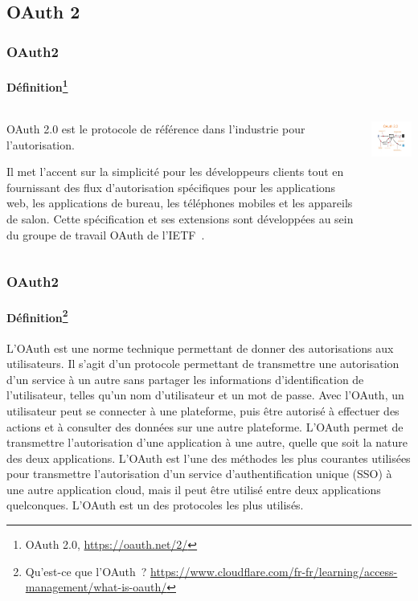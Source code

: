 \documentclass{beamer}
\begin{document}
    \subsection{OAuth 2}\label{subsec:oauth-2}
    \begin{frame}
        \frametitle{OAuth2}
        \framesubtitle{Définition\footnote{OAuth 2.0, \url{https://oauth.net/2/}}}
        \transdissolve
        \begin{columns}
            \begin{column}{0.6\textwidth}
                OAuth 2.0 est le protocole de référence dans l'industrie pour l'autorisation.

                Il met l'accent sur la simplicité pour les développeurs clients tout en fournissant des flux d'autorisation spécifiques pour les applications web, les applications de bureau, les téléphones mobiles et les appareils de salon.
                Cette spécification et ses extensions sont développées au sein du groupe de travail OAuth de l'IETF~.
            \end{column}
            \begin{column}{0.4\textwidth}
                \centering
                \includegraphics[width=6cm]{image/oauth2-flow}
            \end{column}
        \end{columns}
    \end{frame}

    \begin{frame}
        \frametitle{OAuth2}
        \framesubtitle{Définition\footnote{Qu'est-ce que l'OAuth~? \url{https://www.cloudflare.com/fr-fr/learning/access-management/what-is-oauth/}}}
        \transdissolve
        L'OAuth est une norme technique permettant de donner des autorisations aux utilisateurs.
        Il s'agit d'un protocole permettant de transmettre une autorisation d'un service à un autre sans partager les informations d'identification de l'utilisateur, telles qu'un nom d'utilisateur et un mot de passe.
        Avec l'OAuth, un utilisateur peut se connecter à une plateforme, puis être autorisé à effectuer des actions et à consulter des données sur une autre plateforme.
        \bigbreak
        L'OAuth permet de transmettre l'autorisation d'une application à une autre, quelle que soit la nature des deux applications.
        L'OAuth est l'une des méthodes les plus courantes utilisées pour transmettre l'autorisation d'un service d'authentification unique (SSO) à une autre application cloud, mais il peut être utilisé entre deux applications quelconques.
        L'OAuth est un des protocoles les plus utilisés.
    \end{frame}
\end{document}
